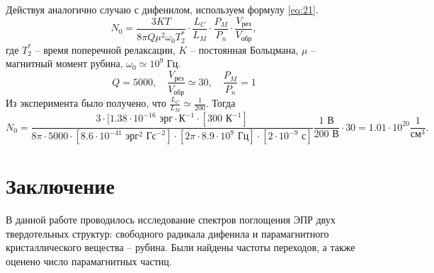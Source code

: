 Действуя аналогично случаю с дифенилом, используем формулу \eqref{eq:21}.
\begin{equation}
    \label{eq:21b}
    N_0 = \frac{3KT}{8 \pi Q \mu^2 \omega_0 T^*_2} \cdot \frac{L_C}{L_M} \cdot \frac{P_M}{P_n} \cdot \frac{V_{\text{рез}}}{V_{\text{обр}}},
\end{equation}
где $T_2^*$ -- время поперечной релаксации,  $K$ -- постоянная Больцмана,  $\mu$ -- магнитный момент рубина,
$\omega_0 \simeq 10^9$ Гц.
\begin{equation}
    \label{eq:}
    Q = 5000, \quad \frac{V_{\text{рез}}}{V_{\text{обр}}} \simeq 30, \quad \frac{P_M}{P_n} = 1
\end{equation}
Из эксперимента было получено, что $\frac{L_C}{L_M} \simeq \frac{1}{200}$. Тогда
\begin{equation}
    N_0 =  \frac{3\cdot[1.38 \cdot 10^{-16} \text{ эрг}\cdot\text{К}^{-1}
    \cdot [300 \text{ К}^{-1}]}{8\pi \cdot 5000\cdot[8.6\cdot 10^{-41} \text{ эрг}^2 \text{ Гс}^{-2}]
\cdot [2\pi \cdot 8.9 \cdot 10^9 \text{ Гц}] \cdot [2 \cdot 10^{-9} \text{ с}] }
\frac{1 \text{ В}}{200 \text{ В}} \cdot 30  = 1.01 \cdot 10^{20} \frac{1}{\text{см}^3}.
\end{equation}

\section*{Заключение}%
В данной работе проводилось исследование спектров поглощения ЭПР двух твердотельных структур:
свободного радикала дифенила и парамагнитного кристаллического вещества -- рубина. Были найдены частоты переходов, а также оценено число парамагнитных частиц. 


